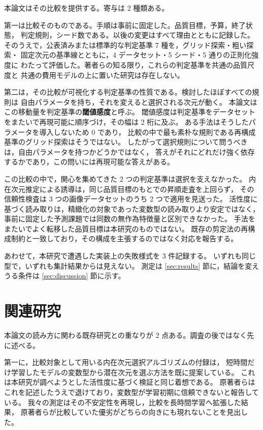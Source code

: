 \documentclass[11pt,a4paper]{jsarticle}
\begin{document}
本論文はその比較を提供する。寄与は 2 種類ある。

第一は比較そのものである。手順は事前に固定した。品質目標，予算，終了状態，
判定規則，シード数である。以後の変更はすべて理由とともに記録した。
そのうえで，公表済みまたは標準的な判定基準 7 種を，グリッド探索・粗い探索・
固定次元の基準線とともに，4 データセット・5 シード・5 通りの正則化強度に
わたって評価した。著者らの知る限り，これらの判定基準を共通の品質尺度と
共通の費用モデルの上に置いた研究は存在しない。

第二は，その比較が可視化する判定基準の性質である。検討したほぼすべての規則は
自由パラメータを持ち，それを変えると選択される次元が動く。
本論文はこの移動量を判定基準の\textbf{閾値感度}と呼ぶ。
閾値感度は判定基準をデータセットをまたいで再現可能に順序づけ，その幅は 2 桁に及ぶ。
ある手法はそうしたパラメータを導入しないため 0 であり，
比較の中で最も素朴な規則である再構成基準のグリッド探索はそうではない。
したがって選択規則について問うべきは，自由パラメータを持つかどうかではなく，
答えがそれにどれだけ強く依存するかであり，この問いには再現可能な答えがある。

この比較の中で，関心を集めてきた 2 つの判定基準は選択を支えなかった。
内在次元推定による誘導は，同じ品質目標のもとでの昇順走査を上回らず，
その信頼性検査は 3 つの画像データセットのうち 2 つで適用を見送った。
活性度に基づく読み取りは，精緻化の対象であった変数型の読み取りより安定ではなく，
事前に固定した予測課題では同数の無作為特徴量と区別できなかった。
手法をまたいでよく転移した品質目標は本研究のものではない。
既存の剪定法の再構成制約と一致しており，その構成を主張するのではなく対応を報告する。

あわせて，本研究で遭遇した実装上の失敗様式を 3 件記録する。
いずれも同じ型で，いずれも集計結果からは見えない。
測定は \ref{sec:results} 節に，結論を変えうる条件は \ref{sec:discussion} 節に示す。

\section{関連研究}\label{sec:related}

本論文の読み方に関わる既存研究との重なりが 2 点ある。調査の後ではなく先に述べる。

第一に，比較対象として用いる内在次元選択アルゴリズム\cite{bonheme2022fondue}の付録は，
短時間だけ学習したモデルの変数型から潜在次元を選ぶ方法を既に提案している。
これは本研究が調べようとした活性度に基づく検証と同じ着想である。
原著者らはこれを記述したうえで退けており，変数型が学習初期に信頼できないと報告している。
我々の測定はその不安定性を再現し，比較を長時間学習へ拡張した結果，
原著者らが比較していた優劣がどちらの向きにも現れないことを見出した。
\end{document}
